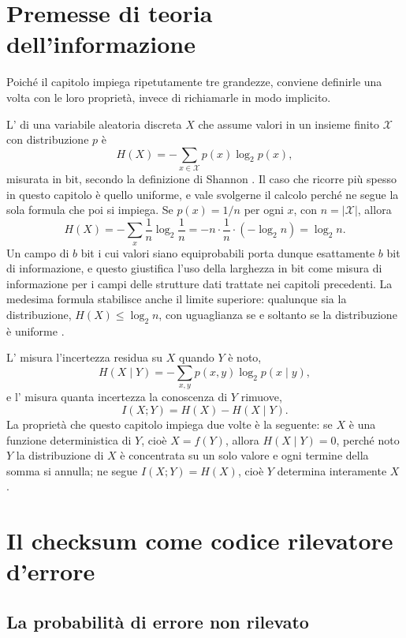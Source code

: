 \section{Premesse di teoria dell'informazione}

Poiché il capitolo impiega ripetutamente tre grandezze, conviene definirle una volta con le loro proprietà, invece di richiamarle in modo implicito.

L' di una variabile aleatoria discreta $X$ che assume valori in un insieme finito $\mathcal{X}$ con distribuzione $p$ è
\[
H(X) = -\sum_{x \in \mathcal{X}} p(x) \log_2 p(x),
\]
misurata in bit, secondo la definizione di Shannon \cite{shannon48}. Il caso che ricorre più spesso in questo capitolo è quello uniforme, e vale svolgerne il calcolo perché ne segue la sola formula che poi si impiega. Se $p(x) = 1/n$ per ogni $x$, con $n = |\mathcal{X}|$, allora
\[
H(X) = -\sum_{x} \frac{1}{n} \log_2 \frac{1}{n}
     = -n \cdot \frac{1}{n} \cdot \left(-\log_2 n\right)
     = \log_2 n.
\]
Un campo di $b$ bit i cui valori siano equiprobabili porta dunque esattamente $b$ bit di informazione, e questo giustifica l'uso della larghezza in bit come misura di informazione per i campi delle strutture dati trattate nei capitoli precedenti. La medesima formula stabilisce anche il limite superiore: qualunque sia la distribuzione, $H(X) \le \log_2 n$, con uguaglianza se e soltanto se la distribuzione è uniforme \cite{cover-thomas}.

L' misura l'incertezza residua su $X$ quando $Y$ è noto,
\[
H(X \mid Y) = -\sum_{x,y} p(x,y) \log_2 p(x \mid y),
\]
e l' misura quanta incertezza la conoscenza di $Y$ rimuove,
\[
I(X; Y) = H(X) - H(X \mid Y).
\]
La proprietà che questo capitolo impiega due volte è la seguente: se $X$ è una funzione deterministica di $Y$, cioè $X = f(Y)$, allora $H(X \mid Y) = 0$, perché noto $Y$ la distribuzione di $X$ è concentrata su un solo valore e ogni termine della somma si annulla; ne segue $I(X; Y) = H(X)$, cioè $Y$ determina interamente $X$ \cite{cover-thomas}.

\section{Il checksum come codice rilevatore d'errore}

\subsection{La probabilità di errore non rilevato}

